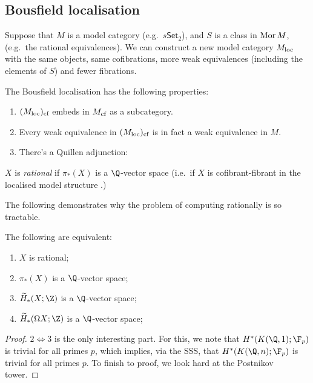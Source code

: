 \documentclass[11pt]{article}
\begin{document}
\begin{JeremyRationalHomotopyPractice}
\subsection*{Bousfield localisation}
Suppose that $M$ is a model category (e.g.\ $s\mathsf{Set}_2$), and $S$ is a class in $\operatorname{Mor} M$, (e.g.\ the rational equivalences). We can construct a new model category $M_{\textup{loc}}$ with the same objects, same cofibrations, more weak equivalences (including the elements of $S$) and fewer fibrations. 
\begin{prop*}
The Bousfield localisation has the following properties:
\begin{enumerate}\squishlist
\item $(M_{\textup{loc}})_{\textup{cf}}$ embeds in $M_{\textup{cf}}$ as a subcategory.
\item Every weak equivalence in  $(M_{\textup{loc}})_{\textup{cf}}$ is in fact a weak equivalence in $M$.
\item There's a Quillen adjunction:
\end{enumerate}
\end{prop*}
\begin{defn*}
$X$ is \emph{rational} if $\pi_*(X)$ is a $\Q$-vector space (i.e.\ if $X$ is cofibrant-fibrant in the localised model structure .)
\end{defn*}
The following demonstrates why the problem of computing rationally is so tractable.
\begin{thm*}
The following are equivalent:
\begin{enumerate}\squishlist
\item $X$ is rational;
\item $\pi_*(X)$ is a $\Q$-vector space;
\item $\widetilde{H}_{*}(X;\Z)$ is a $\Q$-vector space;
\item $\widetilde{H}_{*}(\Omega X;\Z)$ is a $\Q$-vector space;
\end{enumerate}
\end{thm*}
\begin{proof}
$2\iff 3$ is the only interesting part. For this, we note that ${H}^{*}(K(\Q,1);\F_p)$ is trivial for all primes $p$, which implies, via the SSS, that ${H}^{*}(K(\Q,n);\F_p)$ is trivial for all primes $p$. To finish to proof, we look hard at the Postnikov tower.

\end{proof}
\end{JeremyRationalHomotopyPractice}
\end{document}
